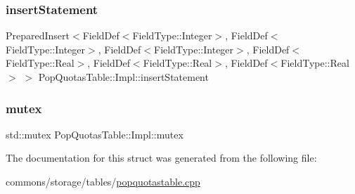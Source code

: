 \subsubsection{\texorpdfstring{insertStatement}{insertStatement}}
{\footnotesize\ttfamily Prepared\+Insert$<$Field\+Def$<$Field\+Type\+::\+Integer$>$, Field\+Def$<$Field\+Type\+::\+Integer$>$, Field\+Def$<$Field\+Type\+::\+Integer$>$, Field\+Def$<$Field\+Type\+::\+Real$>$, Field\+Def$<$Field\+Type\+::\+Real$>$, Field\+Def$<$Field\+Type\+::\+Real$>$ $>$ Pop\+Quotas\+Table\+::\+Impl\+::insert\+Statement}

\mbox{\label{struct_pop_quotas_table_1_1_impl_ac4b1ba51f41c8df65eaac929e1018879}} 
\subsubsection{\texorpdfstring{mutex}{mutex}}
{\footnotesize\ttfamily std\+::mutex Pop\+Quotas\+Table\+::\+Impl\+::mutex}



The documentation for this struct was generated from the following file\+:\begin{DoxyCompactItemize}
\item 
commons/storage/tables/\mbox{\hyperlink{popquotastable_8cpp}{popquotastable.\+cpp}}\end{DoxyCompactItemize}
